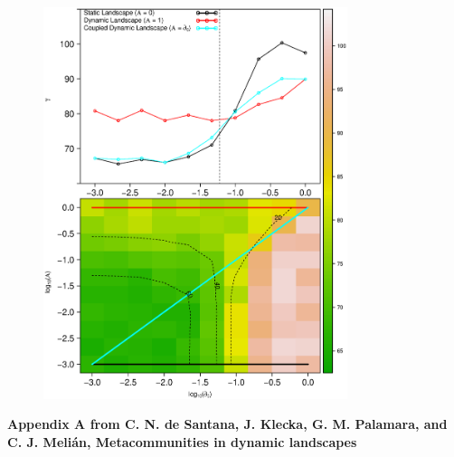 \documentclass[12pt]{article}
\makeatletter
\renewcommand{\@biblabel}[1]{\quad#1.}
\makeatother
\begin{document}
\begin{figure}[hb!]
\begin{center}
\hspace{-0.5 in}\includegraphics[width=3.5in]{./figures/Figure5.eps}
\end{center}
\caption{}
\label{fig:Figure7}
\end{figure}


\appendix
\makeatletter
\renewcommand{\@biblabel}[1]{\quad#1.}
\renewcommand{\thefigure}{S\@arabic\c@figure} 
\makeatother
\pagestyle{myheadings}

\clearpage
\begin{flushleft} 
{\Large \textbf{Appendix A from C. N. de Santana, J. Klecka, G. M. Palamara, and C. J. Meli\'{a}n, Metacommunities in dynamic landscapes}}
\end{flushleft}
\renewcommand{\theequation}{A-\arabic{equation}}
\setcounter{equation}{0}
\renewcommand{\thesection}{A\arabic{section}}
\renewcommand{\thefigure}{A\arabic{figure}}
\renewcommand{\thetable}{A\arabic{table}}
\setcounter{figure}{0}
\setcounter{table}{0}
\end{document}
